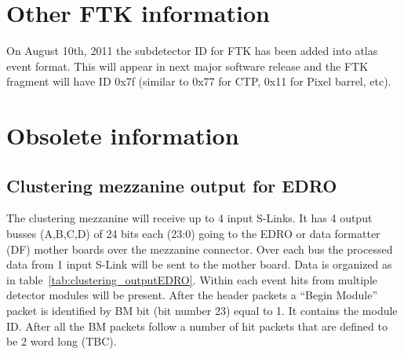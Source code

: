 \documentclass[10pt]{article}
\numberwithin{figure}{section}
\numberwithin{equation}{section}
\numberwithin{table}{section}
\newcommand{\0}{\phantom{0}}
\begin{document}
\newpage

\section{Other FTK information}
On August 10th, 2011 the subdetector ID for FTK has been added into atlas event format.
This will appear in next major software release and the FTK fragment will have ID 0x7f 
(similar to 0x77 for CTP, 0x11 for Pixel barrel, etc).

\newpage

\section{Obsolete information}
\subsection{Clustering mezzanine output for EDRO}
\label{cluOutput}
The clustering mezzanine will receive up to 4 input S-Links.
It has 4 output busses (A,B,C,D) of 24 bits each (23:0) going to the EDRO or data formatter (DF) mother boards over the mezzanine connector.
Over each bus the processed data from 1 input S-Link will be sent to the mother board.
Data is organized as in table~\ref{tab:clustering_outputEDRO}. Within each event hits from multiple detector modules will be present.
After the header packets a ``Begin Module'' packet is identified by BM bit (bit number 23) equal to 1. It contains the module ID. 
After all the BM packets follow a number of hit packets that are defined to be 2 word long (TBC).
\end{document}

